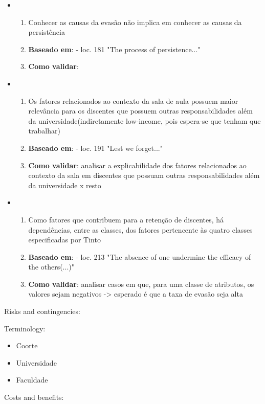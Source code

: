 \documentclass{article}
\begin{document}
\begin{itemize}
\item 
	\begin{enumerate}
	\item Conhecer as causas da evasão não implica em conhecer as causas da persistência
	\item \textbf{Baseado em}: \cite{tinto_completing} - loc. 181 "The process of persistence..."
	\item \textbf{Como validar}: 
	\end{enumerate}
	
\item 
	\begin{enumerate}
	\item Os fatores relacionados ao contexto da sala de aula possuem maior relevância para os discentes que possuem outras responsabilidades além da universidade(indiretamente low-income, pois espera-se que tenham que trabalhar)
	\item \textbf{Baseado em}: \cite{tinto_completing} - loc. 191 "Lest we forget..."
	\item \textbf{Como validar}: analisar a explicabilidade dos fatores relacionados ao contexto da sala em discentes que possuam outras responsabilidades além da universidade x resto
	\end{enumerate}
	
\item 
	\begin{enumerate}
	\item Como fatores que contribuem para a retenção de discentes, há dependências, entre as classes, dos fatores pertencente às quatro classes especificadas por Tinto
	\item \textbf{Baseado em}: \cite{tinto_completing} - loc. 213 "The absence of one undermine the efficacy of the others(...)"
	\item \textbf{Como validar}: analisar casos em que, para uma classe de atributos, os valores sejam negativos -> esperado é que a taxa de evasão seja alta
	\end{enumerate}
\end{itemize}

Risks and contingencies:

Terminology:

\begin{itemize}
\item Coorte
\item Universidade
\item Faculdade
\end{itemize}

Costs and benefits:



\end{document}
